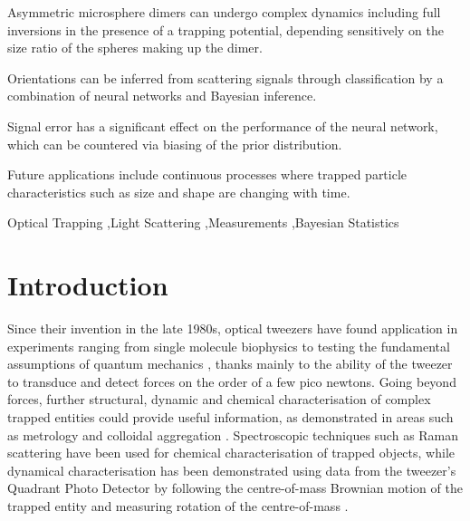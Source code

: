 \documentclass[final,  3p]{elsarticle}
\begin{document}
\begin{frontmatter}
\begin{highlights}
\item Asymmetric microsphere dimers can undergo complex dynamics including full inversions in the presence of a trapping potential, depending sensitively on the size ratio of the spheres making up the dimer.  
\item Orientations can be inferred from scattering signals through classification by a combination of neural networks and Bayesian inference. 
\item Signal error has a significant effect on the performance of the neural network, which can be countered via biasing of the prior distribution. 
\item Future applications include continuous processes where trapped particle characteristics such as size and shape are changing with time.  
\end{highlights}

\begin{keyword}
	Optical Trapping \sep Light Scattering \sep Measurements \sep Bayesian Statistics 
\end{keyword}

\end{frontmatter}

\section{Introduction}
\label{sec:Intro}

Since their invention in the late 1980s, optical tweezers have found application 
in experiments ranging from single molecule biophysics \cite{Bustamante2021Biophysics} to
 testing the fundamental assumptions of quantum mechanics  \cite{yin2013large}, thanks 
mainly to the ability of the tweezer to transduce and detect forces on the order of a 
few pico newtons. Going beyond forces, further structural, dynamic and chemical 
characterisation of complex trapped entities could provide useful information, as 
demonstrated in   areas such as metrology \cite{arita2020coherent} and colloidal
 aggregation \cite{burns1990optical}. Spectroscopic techniques such as Raman scattering 
\cite{gupta2014raman} have been used for chemical characterisation of trapped objects, 
while dynamical characterisation has been demonstrated using data from the tweezer's 
Quadrant Photo Detector by following the centre-of-mass Brownian motion of the trapped 
entity  \cite{friedrich2012tuning} and measuring rotation  of the centre-of-mass 
\cite{yifat2021facile}. 
\end{document}
